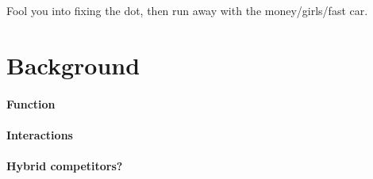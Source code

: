 \documentclass{bioinfo}
\begin{document}
Fool you into fixing the dot, then run away with the money/girls/fast car.

\section{Background}

\paragraph{Function}

\paragraph{Interactions}

\paragraph{Hybrid competitors?}
\end{document}
